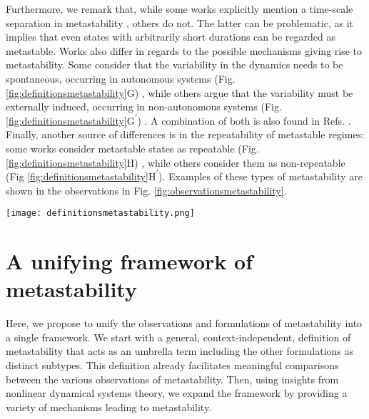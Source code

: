 \documentclass[reprint,superscriptaddress,showpacs,amsmath,amssymb,aps,floatfix,nolongbibliography]{revtex4-2}
\theoremstyle{definition}
\newcommand*{\supprime}{\textsuperscript{\everymodeprime}\xspace}
\newcommand*{\everymodeprime}{\ensuremath{\prime}}
\begin{document}
Furthermore, we remark that, while some works explicitly mention a time-scale separation in metastability \cite{hudson2017metastability, brinkman2022metastable}, others do not. The latter can be problematic, as it implies that even states with arbitrarily short durations can be regarded as metastable.
Works also differ in regards to the possible mechanisms giving rise to metastability. Some consider that the variability in the dynamics needs to be spontaneous, occurring in autonomous systems (Fig. \ref{fig:definitionsmetastability}G) \cite{sasaki2007metastability, kelso2012multistability, roberts2019metastable, fingelkurts2008brainmind, cavanna2018dynamic}, while others argue that the variability must be externally induced, occurring in non-autonomous systems (Fig. \ref{fig:definitionsmetastability}G\supprime) \cite{jercog2017updown, hudson2017metastability}. A combination of both is also found in Refs. \cite{brinkman2022metastable, friston2000transients, lacamera2019cortical}.  
Finally, another source of differences is in the repeatability of metastable regimes: some works consider metastable states as repeatable  (Fig. \ref{fig:definitionsmetastability}H) \cite{graben2019metastable}, while others consider them as non-repeatable (Fig \ref{fig:definitionsmetastability}H\supprime). Examples of these types of metastability are shown in the observations in Fig. \ref{fig:observationsmetastability}.
%
\begin{figure*}[htb]
    \centering
    \texttt{[image: definitionsmetastability.png]}
    \caption{\textbf{Formulations of metastability in the neuroscience literature.} A common theme among these is the presence of transitions between certain aspects of the system's dynamics (e.g., between activity patterns). The upper part of the figure illustrates what these aspects are in each definition, and the bottom part shows characteristics of the transitions. Further details are available in the main text.}
    \label{fig:definitionsmetastability}
\end{figure*}

\section{A unifying framework of metastability}\label{sec:framework}

Here, we propose to unify the observations and formulations of metastability into a single framework. We start with a general, context-independent, definition of metastability that acts as an umbrella term including the other formulations as distinct subtypes. This definition already facilitates meaningful comparisons between the various observations of metastability. Then, using insights from nonlinear dynamical systems theory, we expand the framework by providing a variety of mechanisms leading to metastability. 
\end{document}
